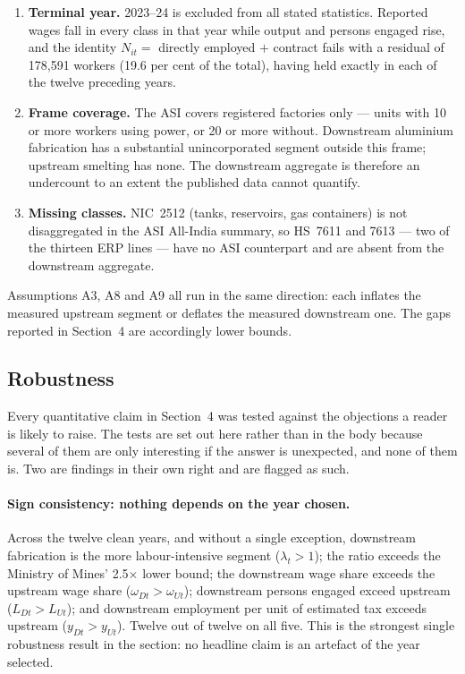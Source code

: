 \begin{enumerate}[label=\textbf{A\arabic*.}, leftmargin=2.6em]
    \item \textbf{Terminal year.} 2023--24 is excluded from all stated statistics.
    Reported wages fall in every class in that year while output and persons
    engaged rise, and the identity $N_{it} = $ directly employed $+$ contract fails
    with a residual of 178,591 workers (19.6 per cent of the total), having held
    exactly in each of the twelve preceding years.

    \item \textbf{Frame coverage.} The ASI covers registered factories only ---
    units with 10 or more workers using power, or 20 or more without. Downstream
    aluminium fabrication has a substantial unincorporated segment outside this
    frame; upstream smelting has none. The downstream aggregate is therefore an
    undercount to an extent the published data cannot quantify.

    \item \textbf{Missing classes.} NIC~2512 (tanks, reservoirs, gas containers) is
    not disaggregated in the ASI All-India summary, so HS~7611 and 7613 --- two of
    the thirteen ERP lines --- have no ASI counterpart and are absent from the
    downstream aggregate.
\end{enumerate}

Assumptions A3, A8 and A9 all run in the same direction: each inflates the
measured upstream segment or deflates the measured downstream one. The gaps
reported in Section~4 are accordingly lower bounds.

\subsection{Robustness}
\label{app:asi_robust_table}

Every quantitative claim in Section~4 was tested against the objections a reader is
likely to raise. The tests are set out here rather than in the body because several of
them are only interesting if the answer is unexpected, and none of them is. Two are
findings in their own right and are flagged as such.

\paragraph{Sign consistency: nothing depends on the year chosen.} Across the twelve
clean years, and without a single exception, downstream fabrication is the more
labour-intensive segment ($\lambda_t > 1$); the ratio exceeds the Ministry of Mines'
2.5$\times$ lower bound; the downstream wage share exceeds the upstream wage share
($\omega_{Dt} > \omega_{Ut}$); downstream persons engaged exceed upstream
($L_{Dt} > L_{Ut}$); and downstream employment per unit of estimated tax exceeds
upstream ($y_{Dt} > y_{Ut}$). Twelve out of twelve on all five. This is the strongest
single robustness result in the section: no headline claim is an artefact of the year
selected.

